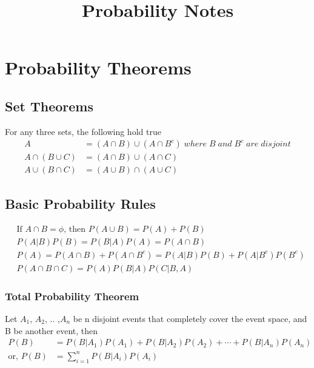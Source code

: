 \documentclass[11pt, a4paper]{article}
\title{Probability Notes}
\begin{document}
    \maketitle{}
    \tableofcontents
    \newpage

    \section{Probability Theorems}
    \subsection{Set Theorems}
    For any three sets, the following hold true
    \begin{align*}
        A &= (A \cap B) \cup (A \cap B^{c}) \;where\;B\;and\;B^{c}\;are\;disjoint \\
        A \cap (B \cup C) &= (A \cap B) \cup (A \cap C) \\
        A \cup (B \cap C) &= (A \cup B) \cap (A \cup C)
    \end{align*}

    \subsection{Basic Probability Rules}
    \begin{align*}
        &\text{If } A \cap B = \phi \text{, then } P(A \cup B) = P(A) + P(B)\\
        &P(A|B)P(B) = P(B|A)P(A) = P(A \cap B) \tag*{Bayes' Theorem}\\
        &P(A) = P(A \cap B) + P(A \cap B^{c}) = P(A|B)P(B) + P(A|B^{c})P(B^{c})\\
        &P(A \cap B \cap C) = P(A) P(B|A) P(C|B,A) \tag*{Chain Rule}
    \end{align*}

    \subsubsection{Total Probability Theorem}
    Let $A_{1}$, $A_{2}$, .. ,$A_{n}$ be n disjoint events that completely cover the event space, and B be another event, then
    \begin{align*}
        P(B) &= P(B|A_{1})P(A_{1}) + P(B|A_{2})P(A_{2}) + \cdots + P(B|A_{n})P(A_{n})\\
        \text{or, } P(B) &= \sum_{i=1}^{n} P(B|A_{i})P(A_{i})
    \end{align*}
\end{document}
